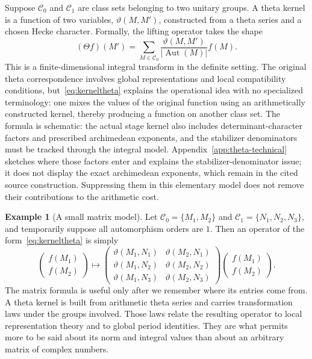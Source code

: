\documentclass[11pt,openany,oneside]{scrbook}
\theoremstyle{definition}
\newtheorem{example}[theorem]{Example}
\theoremstyle{remark}
\begin{document}
Suppose $\mathcal C_0$ and $\mathcal C_1$ are class sets belonging to two unitary groups. A theta kernel is a function of two variables, $\vartheta(M,M')$, constructed from a theta series and a chosen Hecke character. Formally, the lifting operator takes the shape
\begin{equation}\label{eq:kerneltheta}
(\Theta f)(M')
=\sum_{M\in\mathcal C_0}
\frac{\vartheta(M,M')}{|\operatorname{Aut}(M)|}f(M).
\end{equation}
This is a finite-dimensional integral transform in the definite setting. The original theta correspondence involves global representations and local compatibility conditions, but~\eqref{eq:kerneltheta} explains the operational idea with no specialized terminology: one mixes the values of the original function using an arithmetically constructed kernel, thereby producing a function on another class set. The formula is schematic: the actual stage kernel also includes determinant-character factors and prescribed archimedean exponents, and the stabilizer denominators must be tracked through the integral model. Appendix~\ref{app:theta-technical} sketches where those factors enter and explains the stabilizer-denominator issue; it does not display the exact archimedean exponents, which remain in the cited source construction. Suppressing them in this elementary model does not remove their contributions to the arithmetic cost.
\begin{example}[A small matrix model]
Let $\mathcal C_0=\{M_1,M_2\}$ and $\mathcal C_1=\{N_1,N_2,N_3\}$, and temporarily suppose all automorphism orders are $1$. Then an operator of the form~\eqref{eq:kerneltheta} is simply
\[
\begin{pmatrix}f(M_1)\\f(M_2)\end{pmatrix}
\longmapsto
\begin{pmatrix}
\vartheta(M_1,N_1)&\vartheta(M_2,N_1)\\
\vartheta(M_1,N_2)&\vartheta(M_2,N_2)\\
\vartheta(M_1,N_3)&\vartheta(M_2,N_3)
\end{pmatrix}
\begin{pmatrix}f(M_1)\\f(M_2)\end{pmatrix}.
\]
The matrix formula is useful only after we remember where its entries come from. A theta kernel is built from arithmetic theta series and carries transformation laws under the groups involved. Those laws relate the resulting operator to local representation theory and to global period identities. They are what permits more to be said about its norm and integral values than about an arbitrary matrix of complex numbers.
\end{example}
\end{document}
